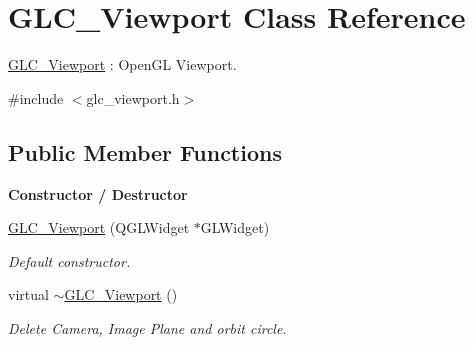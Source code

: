 \hypertarget{class_g_l_c___viewport}{\section{G\-L\-C\-\_\-\-Viewport Class Reference}
\label{class_g_l_c___viewport}
}


\hyperlink{class_g_l_c___viewport}{G\-L\-C\-\_\-\-Viewport} \-: Open\-G\-L Viewport.  




{\ttfamily \#include $<$glc\-\_\-viewport.\-h$>$}

\subsection*{Public Member Functions}
\begin{Indent}{\bf Constructor / Destructor}\par
\begin{DoxyCompactItemize}
\item 
\hyperlink{class_g_l_c___viewport_a4945c51292ee9e176e6d0cf919873d4e}{G\-L\-C\-\_\-\-Viewport} (Q\-G\-L\-Widget $\ast$G\-L\-Widget)
\begin{DoxyCompactList}\small\item\em Default constructor. \end{DoxyCompactList}\item 
virtual \hyperlink{class_g_l_c___viewport_a4df379043dcafd4d791bc6265676fbfb}{$\sim$\-G\-L\-C\-\_\-\-Viewport} ()
\begin{DoxyCompactList}\small\item\em Delete Camera, Image Plane and orbit circle. \end{DoxyCompactList}\end{DoxyCompactItemize}
\end{Indent}
